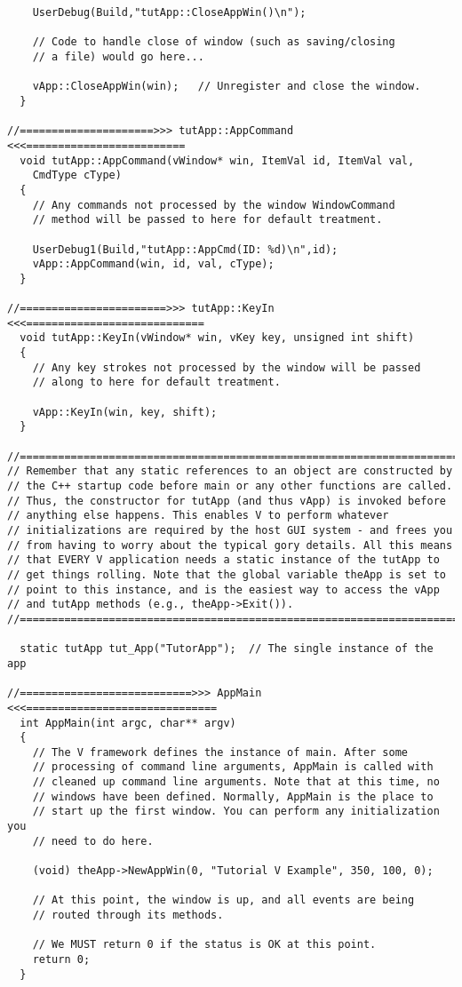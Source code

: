 \begin{verbatim}
    UserDebug(Build,"tutApp::CloseAppWin()\n");

    // Code to handle close of window (such as saving/closing
    // a file) would go here...

    vApp::CloseAppWin(win);   // Unregister and close the window.
  }

//=====================>>> tutApp::AppCommand <<<=========================
  void tutApp::AppCommand(vWindow* win, ItemVal id, ItemVal val,
    CmdType cType)
  {
    // Any commands not processed by the window WindowCommand
    // method will be passed to here for default treatment.

    UserDebug1(Build,"tutApp::AppCmd(ID: %d)\n",id);
    vApp::AppCommand(win, id, val, cType);
  }

//=======================>>> tutApp::KeyIn <<<============================
  void tutApp::KeyIn(vWindow* win, vKey key, unsigned int shift)
  {
    // Any key strokes not processed by the window will be passed
    // along to here for default treatment.

    vApp::KeyIn(win, key, shift);
  }

//========================================================================
// Remember that any static references to an object are constructed by
// the C++ startup code before main or any other functions are called.
// Thus, the constructor for tutApp (and thus vApp) is invoked before
// anything else happens. This enables V to perform whatever
// initializations are required by the host GUI system - and frees you
// from having to worry about the typical gory details. All this means
// that EVERY V application needs a static instance of the tutApp to
// get things rolling. Note that the global variable theApp is set to
// point to this instance, and is the easiest way to access the vApp
// and tutApp methods (e.g., theApp->Exit()).
//========================================================================

  static tutApp tut_App("TutorApp");  // The single instance of the app

//===========================>>> AppMain <<<==============================
  int AppMain(int argc, char** argv)
  {
    // The V framework defines the instance of main. After some
    // processing of command line arguments, AppMain is called with
    // cleaned up command line arguments. Note that at this time, no
    // windows have been defined. Normally, AppMain is the place to
    // start up the first window. You can perform any initialization you
    // need to do here.

    (void) theApp->NewAppWin(0, "Tutorial V Example", 350, 100, 0);

    // At this point, the window is up, and all events are being
    // routed through its methods.

    // We MUST return 0 if the status is OK at this point.
    return 0;
  }
\end{verbatim}
\normalfont\normalsize


